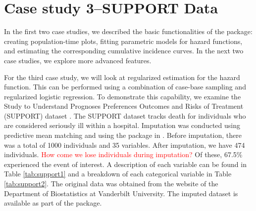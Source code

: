 \documentclass[
]{jss}
\begin{document}
\hypertarget{case-study-3support-data}{%
\section{Case study 3--SUPPORT Data}\label{case-study-3support-data}}

In the first two case studies, we described the basic functionalities of
the  package: creating population-time plots, fitting
parametric models for hazard functions, and estimating the corresponding
cumulative incidence curves. In the next two case studies, we explore
more advanced features.

For the third case study, we will look at regularized estimation for the
hazard function. This can be performed using a combination of case-base
sampling and regularized logistic regression. To demonstrate this
capability, we examine the Study to Understand Prognoses Preferences
Outcomes and Risks of Treatment (SUPPORT) dataset
\citep{knaus1995support}. The SUPPORT dataset tracks death for
individuals who are considered seriously ill within a hospital.
Imputation was conducted using predictive mean matching and using the
 package in  \citep{mice}. Before imputation,
there was a total of 1000 individuals and 35 variables. After
imputation, we have 474 individuals.
\textcolor{red}{How come we lose individuals during imputation?} Of
these, 67.5\% experienced the event of interest. A description of each
variable can be found in Table \ref{tab:support1} and a breakdown of
each categorical variable in Table \ref{tab:support2}. The original data
was obtained from the website of the Department of Biostatistics at
Vanderbilt University. The imputed dataset is available as part of the
 package.
\end{document}

